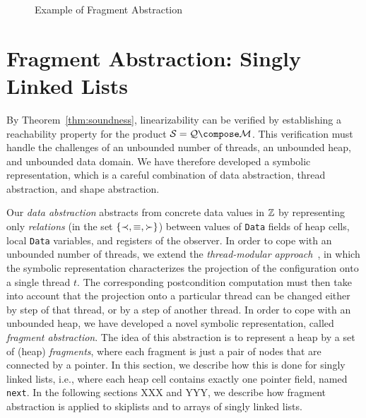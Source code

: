 \begin{center}
\begin{figure}

\caption{Example of Fragment Abstraction}
\label{lazylist}
\end{figure}
\end{center}
\section{Fragment Abstraction: Singly Linked Lists}
\label{sec:annotations}
By Theorem~\ref{thm:soundness}, linearizability can be verified by
establishing a 
reachability property for the product $\system=\augprog\compose\monitor$.
This verification must handle the challenges of
an unbounded number of threads, an unbounded heap, and unbounded data domain.
We have therefore developed a symbolic representation, which
is a careful combination of
data abstraction, thread abstraction, and shape abstraction. 

Our {\em data abstraction} abstracts from concrete data values in
${\mathbb Z}$ by representing only {\em relations}
(in the set $\left\{\prec,\equiv,\succ\right\}$) between values of {\tt Data} fields of 
heap cells, local {\tt Data} variables, and registers of the observer.
In order to cope with an unbounded number of threads,
we extend the {\em thread-modular approach}~\cite{BLMRS:cav08}, in which
the symbolic representation characterizes
the projection of the configuration onto a single thread $t$.
The corresponding postcondition computation must then take into account that
the projection onto a particular thread can be changed either by step of that
thread, or by a step of another thread.
In order to cope with an unbounded heap, we have developed a novel symbolic
representation, called {\em fragment abstraction}.
The idea of this abstraction is
to represent a heap by a set of (heap) {\em fragments}, where each fragment is
just a pair of nodes that are connected by a pointer.
In this section, we describe how this is done
for singly linked lists, i.e., where each heap cell contains exactly one
pointer field, named {\tt next}. In the following sections XXX and YYY, we describe
how fragment abstraction is applied to skiplists and to arrays of singly linked
lists.

